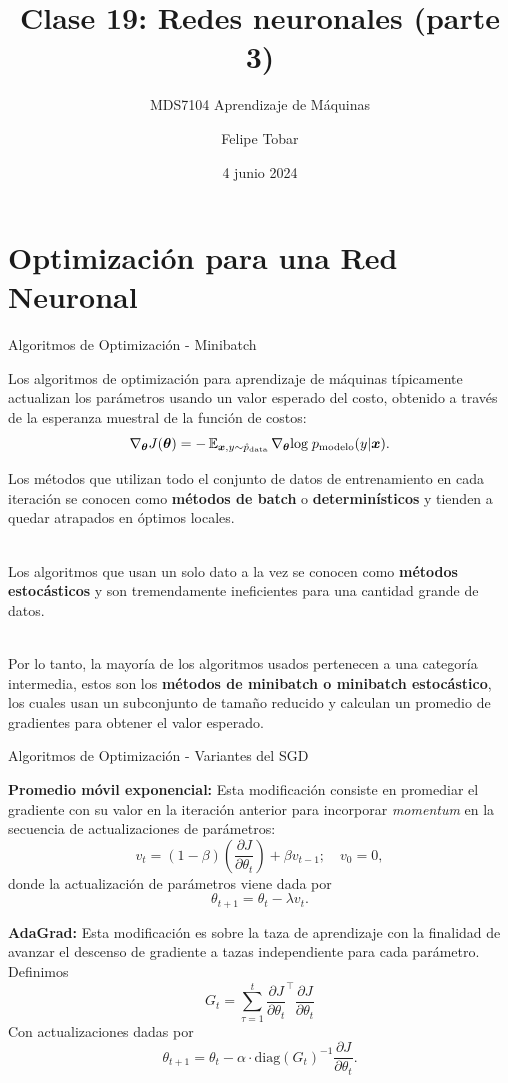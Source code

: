 \documentclass[handout, 9pt]{beamer}
\title{Clase 19: Redes neuronales (parte 3)}
\subtitle{MDS7104 Aprendizaje de Máquinas}
\date{4 junio 2024}
\author{Felipe Tobar}
\institute{Iniciativa de Datos e Inteligencia Artificial\\Universidad de Chile}
\begin{document}
\begin{frame}
  \titlepage
\end{frame}

\section{Optimización para una Red Neuronal}
\begin{frame}{Algoritmos de Optimización - Minibatch}

Los algoritmos de optimización para aprendizaje de máquinas típicamente actualizan los parámetros usando un valor esperado del costo, obtenido a través de la esperanza muestral de la función de costos: \pause
\begin{equation*}
\nabla_{\bm{\theta}}J(\bm{\theta}) = -\operatorname{\mathbb{E}}_{\bm{x},y\sim \hat{p}_{\textrm{data}}}\nabla_{\bm{\theta}}\textrm{log}\; p_{\textrm{modelo}}(y|\bm{x}).
\end{equation*} \pause

Los métodos que utilizan todo el conjunto de datos de entrenamiento en cada iteración se conocen como \textbf{métodos de batch} o \textbf{determinísticos} y tienden a quedar atrapados en óptimos locales. \\~\ \pause 

Los algoritmos que usan un solo dato a la vez se conocen como \textbf{métodos estocásticos} y son tremendamente ineficientes para una cantidad grande de datos. \\~\ 

Por lo tanto, la mayoría de los algoritmos usados pertenecen a una categoría intermedia, estos son los \textbf{métodos de minibatch o minibatch estocástico}, los cuales usan un subconjunto de tamaño reducido y calculan un promedio de gradientes para obtener el valor esperado.


\end{frame}

\begin{frame}{Algoritmos de Optimización - Variantes del SGD}

\textbf{Promedio móvil exponencial:} Esta modificación consiste en promediar el gradiente con su valor en la iteración anterior para incorporar \emph{momentum} en la secuencia de actualizaciones de parámetros: \pause
\[
v_t = (1-\beta) \left ( \frac{\partial J}{\partial \theta_t} \right ) + \beta v_{t-1};  \quad v_0 = 0,
\] \pause
donde la actualización de parámetros viene dada por 
\[
\theta_{t+1} = \theta_t - \lambda v_t.
\] \pause 

\textbf{AdaGrad:} Esta modificación es sobre la taza de aprendizaje con la finalidad de avanzar el descenso de gradiente a tazas independiente para cada parámetro. Definimos \pause
\[
G_{t} = \sum_{\tau=1}^t \frac{\partial J}{\partial \theta_t}^\top \frac{\partial J}{\partial \theta_t}
\] 
Con actualizaciones dadas por \pause
\[
\theta_ {t+1} = \theta_t - \alpha\cdot\text{diag}\left({G_t}\right)^{-1} \frac{\partial J}{\partial \theta_t}.
\]


\end{frame}
\end{document}
